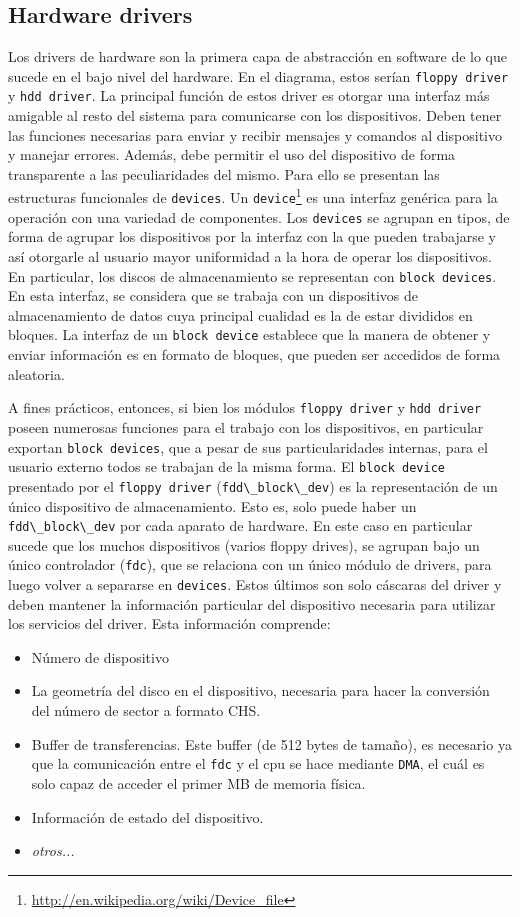\documentclass[a4paper]{article}
\newcommand{\func}[1]{\lstinline{#1}}
\begin{document}
\subsection{Hardware drivers}
Los drivers de hardware son la primera capa de abstracción en software de lo que sucede en el bajo nivel del hardware. En el diagrama, estos serían \func{floppy driver} y \func{hdd driver}. La principal función de estos driver es otorgar una interfaz más amigable al resto del sistema para comunicarse con los dispositivos. Deben tener las funciones necesarias para enviar y recibir mensajes y comandos al dispositivo y manejar errores. Además, debe permitir el uso del dispositivo de forma transparente a las peculiaridades del mismo. Para ello se presentan las estructuras funcionales de \func{devices}. Un \func{device}\footnote{\url{http://en.wikipedia.org/wiki/Device_file}} es una interfaz genérica para la operación con una variedad de componentes. Los \func{devices} se agrupan en tipos, de forma de agrupar los dispositivos por la interfaz con la que pueden trabajarse y así otorgarle al usuario mayor uniformidad a la hora de operar los dispositivos. En particular, los discos de almacenamiento se representan con \func{block devices}. En esta interfaz, se considera que se trabaja con un dispositivos de almacenamiento de datos cuya principal cualidad es la de estar divididos en bloques. La interfaz de un \func{block device} establece que la manera de obtener y enviar información es en formato de bloques, que pueden ser accedidos de forma aleatoria. 

A fines prácticos, entonces, si bien los módulos \func{floppy driver} y \func{hdd driver} poseen numerosas funciones para el trabajo con los dispositivos, en particular exportan \func{block devices}, que a pesar de sus particularidades internas, para el usuario externo todos se trabajan de la misma forma. El \func{block device} presentado por el \func{floppy driver} (\func{fdd\_block\_dev}) es la representación de un único dispositivo de almacenamiento. Esto es, solo puede haber un \func{fdd\_block\_dev} por cada aparato de hardware. En este caso en particular sucede que los muchos dispositivos (varios floppy drives), se agrupan bajo un único controlador (\func{fdc}), que se relaciona con un único módulo de drivers, para luego volver a separarse en \func{devices}. Estos últimos son solo cáscaras del driver y deben mantener la información particular del dispositivo necesaria para utilizar los servicios del driver. Esta información comprende: 

\begin{itemize}
 \item Número de dispositivo 
 \item La geometría del disco en el dispositivo, necesaria para hacer la conversión del número de sector a formato CHS.
 \item Buffer de transferencias. Este buffer (de 512 bytes de tamaño), es necesario ya que la comunicación entre el \func{fdc} y el cpu se hace mediante \func{DMA}, el cuál es solo capaz de acceder el primer MB de memoria física. 
\item Información de estado del dispositivo. 
 \item \emph{otros...}
\end{itemize}
\end{document}
